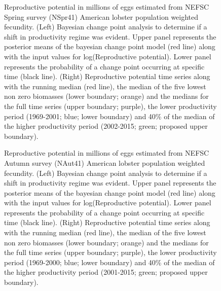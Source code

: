 \documentclass[11pt]{article}
\newcommand{\e}{/backup/bio_data/bio.lobster/figures/} %
\begin{document}
\begin{landscape}
\begin{figure}
\centering
    
\caption{Reproductive potential in millions of eggs estimated from NEFSC Spring survey (NSpr41) American lobster population weighted fecundity.  (Left) Bayesian change point analysis to determine if a shift in productivity regime was evident. Upper panel represents the posterior means of the bayesian change point model (red line) along with the input values for log(Reproductive potential). Lower panel represents the probability of a change point occurring at specific time (black line). (Right) Reproductive potential time series along with the running median (red line), the median of the five lowest non zero biomasses (lower boundary; orange) and the medians for the full time series (upper boundary; purple), the lower productivity period (1969-2001; blue; lower boundary) and 40\% of the median of the higher productivity period (2002-2015; green; proposed upper boundary). }
\end{figure}
\end{landscape}


\begin{landscape}
\begin{figure}
\centering
    
\caption{Reproductive potential in millions of eggs estimated from NEFSC Autumn survey (NAut41) American lobster population weighted fecundity.  (Left) Bayesian change point analysis to determine if a shift in productivity regime was evident. Upper panel represents the posterior means of the bayesian change point model (red line) along with the input values for log(Reproductive potential). Lower panel represents the probability of a change point occurring at specific time (black line). (Right) Reproductive potential time series along with the running median (red line), the median of the five lowest non zero biomasses (lower boundary; orange) and the medians for the full time series (upper boundary; purple), the lower productivity period (1969-2000; blue; lower boundary) and 40\% of the median of the higher productivity period (2001-2015; green; proposed upper boundary). }
\end{figure}
\end{landscape}
\end{document}
